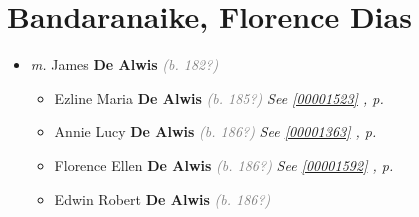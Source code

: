 \documentclass[10pt, openany]{book}
\begin{document}
\chapter{Bandaranaike, Florence Dias}
\label{00001521}
\textcolor{slmaroon}{\textit{}}
\begin{itemize}
\item{\textit{m.} James \textbf{De Alwis} \textcolor{gray}{\textit{(b. 182?)}}   \label{couple:00001521:00001522} \begin{itemize}
\item{Ezline Maria \textbf{De Alwis} \textcolor{gray}{\textit{(b. 185?)}} \textcolor{slteal}{\textit{See  \autoref{00001523} \textit{, p. \pageref{00001523} }}}}
\item{Annie Lucy  \textbf{De Alwis} \textcolor{gray}{\textit{(b. 186?)}} \textcolor{slteal}{\textit{See  \autoref{00001363} \textit{, p. \pageref{00001363} }}}}
\item{Florence Ellen \textbf{De Alwis} \textcolor{gray}{\textit{(b. 186?)}} \textcolor{slteal}{\textit{See  \autoref{00001592} \textit{, p. \pageref{00001592} }}}}
\item{Edwin Robert \textbf{De Alwis} \textcolor{gray}{\textit{(b. 186?)}}
   }
\end{itemize}}
\end{itemize}
  
\end{document}
